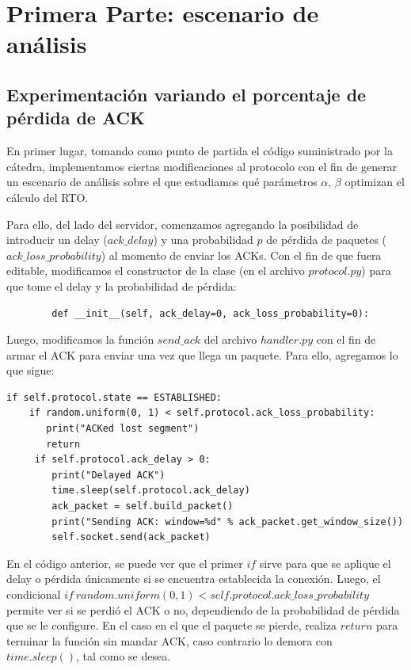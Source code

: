 \documentclass[10pt, a4paper]{article}
\begin{document}
\newpage
\section{Primera Parte: escenario de análisis}

\subsection{Experimentación variando el porcentaje de pérdida de ACK}
En primer lugar, tomando como punto de partida el código suministrado por la cátedra, implementamos ciertas modificaciones al protocolo con el fin de generar un escenario de análisis sobre el que estudiamos qué parámetros $\alpha$, $\beta$ optimizan el cálculo del RTO.

Para ello, del lado del servidor, comenzamos agregando la posibilidad de introducir un delay ($ack\_delay$) y una probabilidad $p$ de pérdida de paquetes ($ack\_loss\_probability$) al momento de enviar los ACKs. Con el fin de que fuera editable, modificamos el constructor de la clase (en el archivo $protocol.py$) para que tome el delay y la probabilidad de pérdida:
\begin{verbatim}
		def __init__(self, ack_delay=0, ack_loss_probability=0):
\end{verbatim}

Luego, modificamos la función $send\_ack$ del archivo $handler.py$ con el fin de armar el ACK para enviar una vez que llega un paquete. Para ello, agregamos lo que sigue:

\begin{verbatim}
if self.protocol.state == ESTABLISHED:
    if random.uniform(0, 1) < self.protocol.ack_loss_probability:
       print("ACKed lost segment")
       return
     if self.protocol.ack_delay > 0:
        print("Delayed ACK")
        time.sleep(self.protocol.ack_delay)
        ack_packet = self.build_packet()
        print("Sending ACK: window=%d" % ack_packet.get_window_size())
        self.socket.send(ack_packet)
\end{verbatim}
        
En el código anterior, se puede ver que el primer $if$ sirve para que se aplique el delay o pérdida únicamente si se encuentra establecida la conexión.
Luego, el condicional $if\ random.uniform(0, 1) < self.protocol.ack\_loss\_probability$ permite ver si se perdió el ACK o no, dependiendo de la probabilidad de pérdida que se le configure. En el caso en el que el paquete se pierde, realiza $return$ para terminar la función sin mandar ACK, caso contrario lo demora con $time.sleep()$, tal como se desea.
\end{document}
